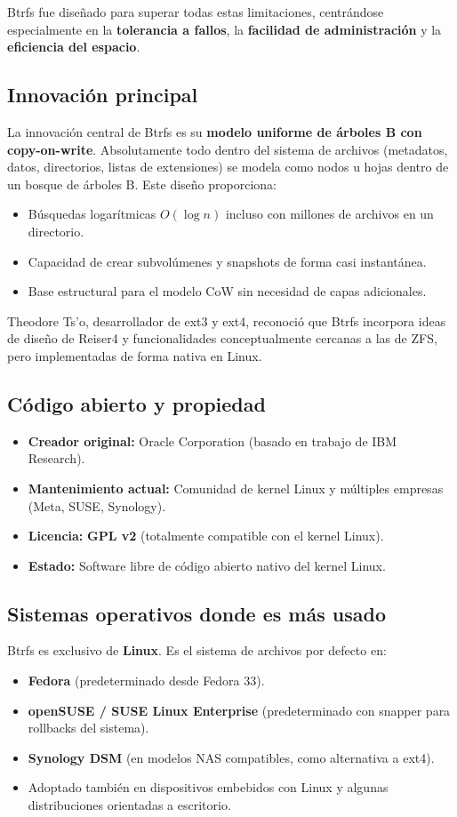 \documentclass[12pt,letterpaper]{article}
\begin{document}
Btrfs fue diseñado para superar todas estas limitaciones, centrándose especialmente en la
\textbf{tolerancia a fallos}, la \textbf{facilidad de administración} y la \textbf{eficiencia del espacio}.

\subsection{Innovación principal}
La innovación central de Btrfs es su \textbf{modelo uniforme de árboles B con copy-on-write}. Absolutamente todo
dentro del sistema de archivos (metadatos, datos, directorios, listas de extensiones) se modela como nodos u
hojas dentro de un bosque de árboles B. Este diseño proporciona:

\begin{itemize}
\item Búsquedas logarítmicas $O(\log n)$ incluso con millones de archivos en un directorio.
\item Capacidad de crear subvolúmenes y snapshots de forma casi instantánea.
\item Base estructural para el modelo CoW sin necesidad de capas adicionales.
\end{itemize}

Theodore Ts'o, desarrollador de ext3 y ext4, reconoció que Btrfs incorpora ideas de diseño de Reiser4 y
funcionalidades conceptualmente cercanas a las de ZFS, pero implementadas de forma nativa en Linux.

\subsection{Código abierto y propiedad}
\begin{itemize}
\item \textbf{Creador original:} Oracle Corporation (basado en trabajo de IBM Research).
\item \textbf{Mantenimiento actual:} Comunidad de kernel Linux y múltiples empresas (Meta, SUSE, Synology).
\item \textbf{Licencia:} \textbf{GPL v2} (totalmente compatible con el kernel Linux).
\item \textbf{Estado:} Software libre de código abierto nativo del kernel Linux.
\end{itemize}

\subsection{Sistemas operativos donde es más usado}
Btrfs es exclusivo de \textbf{Linux}. Es el sistema de archivos por defecto en:
\begin{itemize}
\item \textbf{Fedora} (predeterminado desde Fedora 33).
\item \textbf{openSUSE / SUSE Linux Enterprise} (predeterminado con snapper para rollbacks del sistema).
\item \textbf{Synology DSM} (en modelos NAS compatibles, como alternativa a ext4).
\item Adoptado también en dispositivos embebidos con Linux y algunas distribuciones orientadas a escritorio.
\end{itemize}
\end{document}

